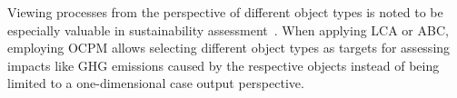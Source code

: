 Viewing processes from the perspective of different object types is noted to be especially valuable in sustainability assessment~\cite{Graves23rethink,vanderAalst23twin}.
When applying LCA or ABC, employing OCPM allows selecting different object types as targets for assessing impacts like GHG emissions caused by the respective objects instead of being limited to a one-dimensional case output perspective.
